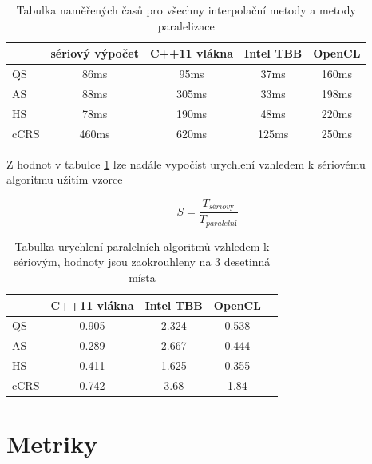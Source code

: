 \documentclass[]{thesiskiv}
\begin{document}
\begin{table}[ht]
\begin{center}
	\begin{tabular}{ | l | c | c | c | c | }
		\hline
    	~ & sériový výpočet & C++11 vlákna & Intel TBB & OpenCL \\
		\hline
		\hline
		QS & 86ms & 95ms & 37ms & 160ms \\ \hline
		AS & 88ms & 305ms & 33ms & 198ms \\ \hline
		HS & 78ms & 190ms & 48ms & 220ms \\ \hline
		cCRS & 460ms & 620ms & 125ms & 250ms \\
		\hline
  \end{tabular}
  \caption{Tabulka naměřených časů pro všechny interpolační metody a metody paralelizace}\label{tab:times}
  \end{center}
\end{table}

Z hodnot v tabulce \ref{tab:times} lze nadále vypočíst urychlení vzhledem k sériovému algoritmu užitím vzorce

\begin{equation}
S = \frac{T_{sériový}}{T_{paralelní}}
\end{equation}

\begin{table}[ht]
\begin{center}
	\begin{tabular}{ | l | c | c | c | c | }
		\hline
    	~ & C++11 vlákna & Intel TBB & OpenCL \\
		\hline
		\hline
		QS & {\color{Red} 0.905} & {\color{OliveGreen} 2.324} & {\color{Red} 0.538} \\ \hline
		AS & {\color{Red} 0.289} & {\color{OliveGreen} 2.667} & {\color{Red} 0.444} \\ \hline
		HS & {\color{Red} 0.411} & {\color{OliveGreen} 1.625} & {\color{Red} 0.355} \\ \hline
		cCRS & {\color{Red} 0.742} & {\color{OliveGreen} 3.68} & {\color{OliveGreen} 1.84} \\
		\hline
  \end{tabular}
  \caption{Tabulka urychlení paralelních algoritmů vzhledem k sériovým, hodnoty jsou zaokrouhleny na 3 desetinná místa}
  \end{center}
\end{table}


\section{Metriky}
\end{document}
